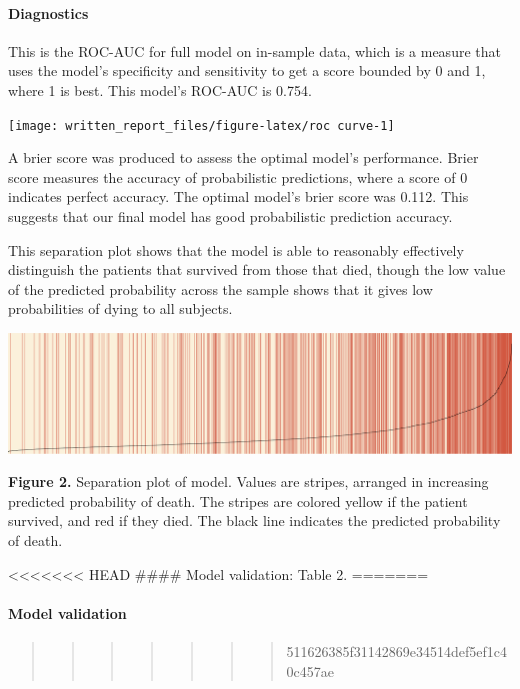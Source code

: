 \documentclass[
]{article}
\begin{document}
\hypertarget{diagnostics}{%
\paragraph{Diagnostics}\label{diagnostics}}

This is the ROC-AUC for full model on in-sample data, which is a measure
that uses the model's specificity and sensitivity to get a score bounded
by 0 and 1, where 1 is best. This model's ROC-AUC is 0.754.

\texttt{[image: written\_report\_files/figure-latex/roc curve-1]}

A brier score was produced to assess the optimal model's performance.
Brier score measures the accuracy of probabilistic predictions, where a
score of 0 indicates perfect accuracy. The optimal model's brier score
was 0.112. This suggests that our final model has good probabilistic
prediction accuracy.

This separation plot shows that the model is able to reasonably
effectively distinguish the patients that survived from those that died,
though the low value of the predicted probability across the sample
shows that it gives low probabilities of dying to all subjects.

\includegraphics{images/sep_plot_full.png}

\textbf{Figure 2.} Separation plot of model. Values are stripes,
arranged in increasing predicted probability of death. The stripes are
colored yellow if the patient survived, and red if they died. The black
line indicates the predicted probability of death.

\textless\textless\textless\textless\textless\textless\textless{} HEAD
\#\#\#\# Model validation: Table 2. =======

\hypertarget{model-validation-1}{%
\paragraph{Model validation}\label{model-validation-1}}

\begin{quote}
\begin{quote}
\begin{quote}
\begin{quote}
\begin{quote}
\begin{quote}
\begin{quote}
511626385f31142869e34514def5ef1c40c457ae
\end{quote}
\end{quote}
\end{quote}
\end{quote}
\end{quote}
\end{quote}
\end{quote}
\end{document}
